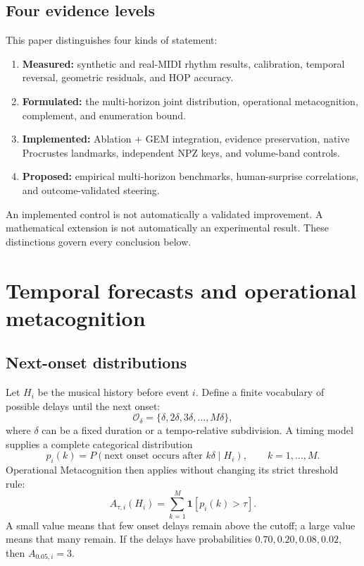 \documentclass[11pt,a4paper]{article}
\begin{document}
\subsection{Four evidence levels}
This paper distinguishes four kinds of statement:
\begin{enumerate}[nosep]
  \item \textbf{Measured:} synthetic and real-MIDI rhythm results, calibration, temporal reversal, geometric residuals, and HOP accuracy.
  \item \textbf{Formulated:} the multi-horizon joint distribution, operational metacognition, complement, and enumeration bound.
  \item \textbf{Implemented:} Ablation + GEM integration, evidence preservation, native Procrustes landmarks, independent NPZ keys, and volume-band controls.
  \item \textbf{Proposed:} empirical multi-horizon benchmarks, human-surprise correlations, and outcome-validated steering.
\end{enumerate}
An implemented control is not automatically a validated improvement. A mathematical extension is not automatically an experimental result. These distinctions govern every conclusion below.

\section{Temporal forecasts and operational metacognition}
\subsection{Next-onset distributions}
Let $H_i$ be the musical history before event $i$. Define a finite vocabulary of possible delays until the next onset:
\begin{equation}
\mathcal{O}_\delta=\{\delta,2\delta,3\delta,\ldots,M\delta\},
\end{equation}
where $\delta$ can be a fixed duration or a tempo-relative subdivision. A timing model supplies a complete categorical distribution
\begin{equation}
p_i(k)=P(\text{next onset occurs after }k\delta\mid H_i),\qquad k=1,\ldots,M.
\end{equation}
Operational Metacognition then applies without changing its strict threshold rule:
\begin{equation}
A_{\tau,i}(H_i)=\sum_{k=1}^{M}\mathbf{1}\!\left[p_i(k)>\tau\right].
\label{eq:onset-volume}
\end{equation}
A small value means that few onset delays remain above the cutoff; a large value means that many remain. If the delays have probabilities $0.70,0.20,0.08,0.02$, then $A_{0.05,i}=3$.
\end{document}
